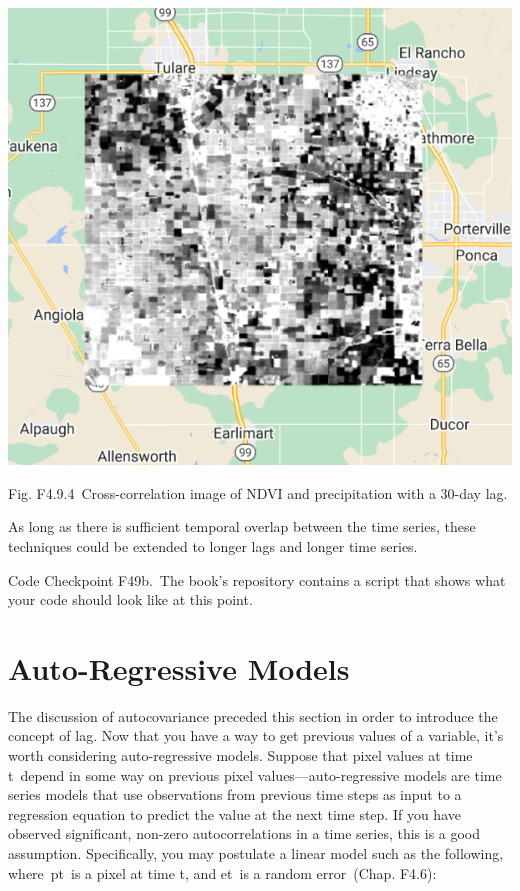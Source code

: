 \documentclass[
  letterpaper,
  DIV=11,
  numbers=noendperiod]{scrreprt}
\begin{document}
\includegraphics{./F4/image34.png}

Fig. F4.9.4~Cross-correlation image of NDVI and precipitation with a
30-day lag.

As long as there is sufficient temporal overlap between the time series,
these techniques could be extended to longer lags and longer time
series.

\begin{tcolorbox}[enhanced jigsaw, left=2mm, breakable, rightrule=.15mm, opacityback=0, colframe=quarto-callout-note-color-frame, colbacktitle=quarto-callout-note-color!10!white, arc=.35mm, opacitybacktitle=0.6, toptitle=1mm, colback=white, leftrule=.75mm, title=\textcolor{quarto-callout-note-color}{\faInfo}\hspace{0.5em}{Note}, toprule=.15mm, bottomtitle=1mm, titlerule=0mm, bottomrule=.15mm, coltitle=black]

Code Checkpoint F49b.~The book's repository contains a script that shows
what your code should look like at this point.

\end{tcolorbox}

\hypertarget{auto-regressive-models}{%
\section{Auto-Regressive Models}\label{auto-regressive-models}}

The discussion of autocovariance preceded this section in order to
introduce the concept of lag. Now that you have a way to get previous
values of a variable, it's worth considering auto-regressive models.
Suppose that pixel values at time t~depend in some way on previous pixel
values---auto-regressive models are time series models that use
observations from previous time steps as input to a regression equation
to predict the value at the next time step. If you have observed
significant, non-zero autocorrelations in a time series, this is a good
assumption. Specifically, you may postulate a linear model such as the
following, where~pt~is a pixel at time t, and et~is a random
error~(Chap. F4.6):
\end{document}
